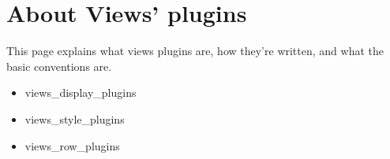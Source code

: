 \section{About Views' plugins}\label{views_plugins}
This page explains what views plugins are, how they're written, and what the basic conventions are.

\begin{itemize}
\item views\_\-display\_\-plugins\item views\_\-style\_\-plugins\item views\_\-row\_\-plugins \end{itemize}
